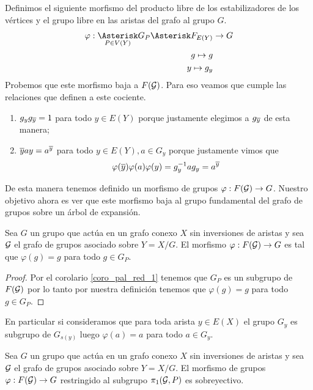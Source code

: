 \documentclass[tesis.tex]{subfiles}
\begin{document}
Definimos el siguiente morfismo del producto libre de los estabilizadores de los vértices y el grupo libre en las aristas del grafo al grupo $G$.
\begin{align*}
	\varphi: \underset{P \in V(Y)}{\Asterisk} G_P \Asterisk F_{E(Y)} &\to G	\\
	g \mapsto g \\
	y \mapsto g_y \\
\end{align*}
Probemos que este morfismo baja a $F({\cal G})$. 
Para eso veamos que cumple las relaciones que definen a este cociente.
\begin{enumerate}
	\item $g_y g_{\overline y} = 1$ para todo $y \in E(Y)$ porque justamente elegimos a $g_{\overline y}$ de esta manera;
	\item $\overline y a y = a^{\overline y}$ para todo $y \in E(Y), a \in G_y$ porque justamente vimos que 
	\[
		\varphi(\overline y) \varphi (a) \varphi(y) = g_y^{-1}ag_y = a^{\overline y}
	\]
\end{enumerate}

De esta manera tenemos definido un morfismo de grupos $\varphi: F({\cal G}) \to G$.
Nuestro objetivo ahora es ver que este morfismo baja al grupo fundamental del grafo de grupos sobre un árbol de expansión.

\begin{lema}\label{lema_morfismo_pi1_inyectivo}
	Sea $G$ un grupo que actúa en un grafo conexo $X$ sin inversiones de aristas y sea ${\cal G}$ el grafo de grupos asociado sobre $Y = X / G$.
	El morfismo $\varphi:F({\cal G}) \to G$ es tal que $\varphi(g) = g$ para todo $g \in G_{P}$.
\end{lema}

\begin{proof}
	Por el corolario \ref{coro_pal_red_1} tenemos que $G_{P}$ es un subgrupo de $F({\cal G})$ por lo tanto por nuestra definición tenemos que $\varphi(g) = g$ para todo $g \in G_{P}$.
\end{proof}

En particular si consideramos que para toda arista $y \in E(X)$ el grupo $G_y$ es subgrupo de $G_{s(y)}$ luego $\varphi(a) = a$ para todo $a \in G_{y}$.

\begin{prop}\label{prop_morf_grp_restr_sobre}
	Sea $G$ un grupo que actúa en un grafo conexo $X$ sin inversiones de aristas y sea ${\cal G}$ el grafo de grupos asociado sobre $Y = X / G$.
	El morfismo de grupos $\varphi: F({\cal G}) \to G$ restringido al subgrupo $\pi_1({\cal G}, P)$ es sobreyectivo.
\end{prop}
\end{document}
